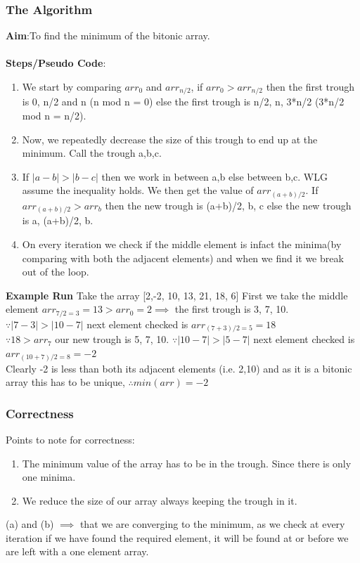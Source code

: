 \documentclass[a4paper,12pt]{report}
\begin{document}
\begin{enumerate}
\subsubsection*{The Algorithm}
\textbf{Aim}:To find the minimum of the bitonic array.\\\\
\textbf{Steps/Pseudo Code}:\\
\begin{enumerate}
\item We start by comparing $arr_0$ and $arr_{n/2}$, if $arr_0 > arr_{n/2}$ then the first trough is 0, n/2 and n (n mod n = 0) else the first trough is n/2, n, 3*n/2 (3*n/2 mod n = n/2).
\item Now, we repeatedly decrease the size of this trough to end up at the minimum. Call the trough a,b,c.
\item If $|a-b|>|b-c|$ then we work in between a,b else between b,c. WLG assume the inequality holds. We then get the value of $arr_{(a+b)/2}$. If $arr_{(a+b)/2} > arr_b$ then the new trough is (a+b)/2, b, c else the new trough is a, (a+b)/2, b.
\item On every iteration we check if the middle element is infact the minima(by comparing with both the adjacent elements) and when we find it we break out of the loop.
\end{enumerate}
\textbf{Example Run}
Take the array [2,-2, 10, 13, 21, 18, 6]
First we take the middle element $arr_{7/2 = 3} = 13 > arr_0 = 2 \implies$ the first trough is 3, 7, 10.\\
$ \because |7-3| > |10-7|$ next element checked is $arr_{(7+3)/2 = 5} = 18$\\
$\because 18>arr_7$ our new trough is 5, 7, 10.
$ \because |10-7| > |5-7|$ next element checked is $arr_{(10+7)/2 = 8} = -2$\\
Clearly -2 is less than both its adjacent elements (i.e. 2,10) and as it is a bitonic array this has to be unique, $\therefore min(arr) = -2$
\subsubsection*{Correctness}
Points to note for correctness:
\begin{enumerate}
\item The minimum value of the array has to be in the trough. Since there is only one minima.
\item We reduce the size of our array always keeping the trough in it.
\end{enumerate}
(a) and (b) $\implies$ that we are converging to the minimum, as we check at every iteration if we have found the required element, it will be found at or before we are left with a one element array.

\end{enumerate}
\end{document}
